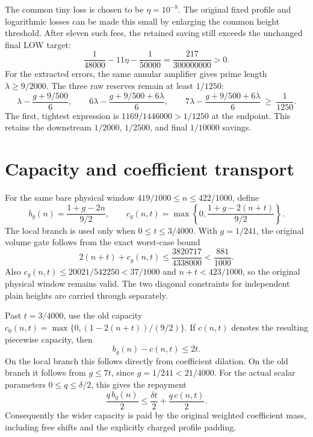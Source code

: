 \documentclass[10pt]{article}
\begin{document}
The common tiny loss is chosen to be $\eta=10^{-8}$. The original fixed
profile and logarithmic losses can be made this small by enlarging the common
height threshold. After eleven such fees, the retained saving still exceeds
the unchanged final LOW target:
\[
 \frac1{48000}-11\eta-\frac1{50000}
 =\frac{217}{300000000}>0.
\]
For the extracted errors, the same annular amplifier gives prime length
$\lambda\ge9/2000$. The three raw reserves remain at least $1/1250$:
\[
 \lambda-\frac{g+9/500}{6},\qquad
 6\lambda-\frac{g+9/500+6\lambda}{6},\qquad
 7\lambda-\frac{g+9/500+6\lambda}{6}\ \ge\ \frac1{1250}.
\]
The first, tightest expression is $1169/1446000>1/1250$ at the endpoint.
This retains the downstream $1/2000$, $1/2500$, and final $1/10000$ savings.

\section{Capacity and coefficient transport}
For the same bare physical window $419/1000\le n\le422/1000$, define
\[
 b_g(n)=\frac{1+g-2n}{9/2},\qquad
 c_g(n,t)=\max\left\{0,\frac{1+g-2(n+t)}{9/2}\right\}.
\]
The local branch is used only when $0\le t\le3/4000$. With $g=1/241$,
the original volume gate follows from the exact worst-case bound
\[
 2(n+t)+c_g(n,t)
 \le\frac{3820717}{4338000}<\frac{881}{1000}.
\]
Also $c_g(n,t)\le20021/542250<37/1000$ and $n+t<423/1000$,
so the original physical window remains valid. The two diagonal constraints
for independent plain heights are carried through separately.

Past $t=3/4000$, use the old capacity
$c_0(n,t)=\max\{0,(1-2(n+t))/(9/2)\}$.
If $c(n,t)$ denotes the resulting piecewise capacity, then
\[
 b_g(n)-c(n,t)\le2t.
\]
On the local branch this follows directly from coefficient dilation. On the
old branch it follows from $g\le7t$, since $g=1/241<21/4000$.
For the actual scalar parameters $0\le q\le\delta/2$, this gives the repayment
\[
 \frac{q\,b_g(n)}2\le\frac{\delta t}{2}+\frac{q\,c(n,t)}2.
\]
Consequently the wider capacity is paid by the original weighted coefficient
mass, including free shifts and the explicitly charged profile padding.
\end{document}
